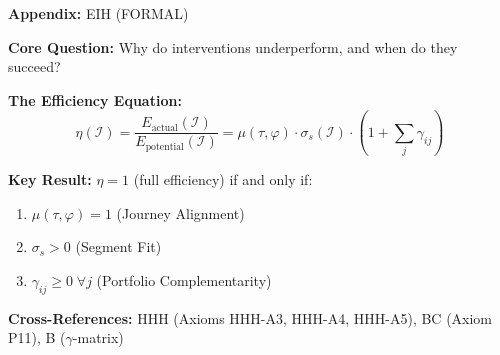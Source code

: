 
\begin{tcolorbox}[colback=blue!5!white, colframe=blue!75!black,
    title=Quick Reference: Efficient Intervention Hypothesis]
\textbf{Appendix:} EIH (FORMAL)


\textbf{Core Question:} Why do interventions underperform, and when do they succeed?

\textbf{The Efficiency Equation:}
\begin{equation}
\eta(\mathcal{I}) = \frac{E_{\text{actual}}(\mathcal{I})}{E_{\text{potential}}(\mathcal{I})} = \mu(\tau, \varphi) \cdot \sigma_s(\mathcal{I}) \cdot \left(1 + \sum_j \gamma_{ij}\right)
\label{eq:eih-efficiency}
\end{equation}

\textbf{Key Result:} $\eta = 1$ (full efficiency) if and only if:
\begin{enumerate}[nosep]
\item $\mu(\tau, \varphi) = 1$ \quad (Journey Alignment)
\item $\sigma_s > 0$ \quad (Segment Fit)
\item $\gamma_{ij} \geq 0 \; \forall j$ \quad (Portfolio Complementarity)
\end{enumerate}

\textbf{Cross-References:} HHH (Axioms HHH-A3, HHH-A4, HHH-A5), BC (Axiom P11), B ($\gamma$-matrix)
\end{tcolorbox}



